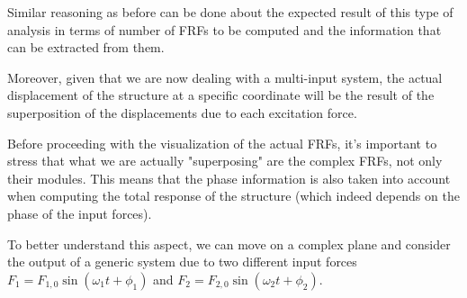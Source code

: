 Similar reasoning as before can be done about the expected result of this type of analysis in terms of number of FRFs to be computed and the information that can be extracted from them.

Moreover, given that we are now dealing with a multi-input system, the actual displacement of the structure at a specific coordinate will be the result of the superposition of the displacements due to each excitation force.

Before proceeding with the visualization of the actual FRFs, it's important to stress that what we are actually "superposing" are the complex FRFs, not only their modules.
This means that the phase information is also taken into account when computing the total response of the structure (which indeed depends on the phase of the input forces).

To better understand this aspect, we can move on a complex plane and consider the output of a generic system due to two different input forces $F_1 = F_{1,0} \sin(\omega_1 t + \phi_1)$ and $F_2 = F_{2,0} \sin(\omega_2 t + \phi_2)$.

